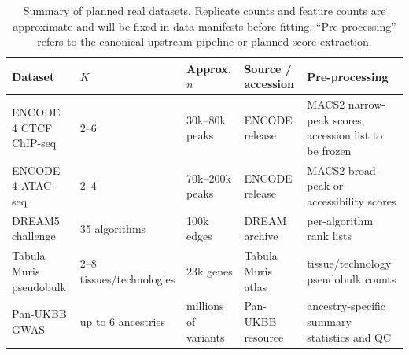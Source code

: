 \begin{table}[H]
\centering
{}
\caption{Summary of planned real datasets. Replicate counts and feature counts are approximate and will be fixed in data manifests before fitting. ``Pre-processing'' refers to the canonical upstream pipeline or planned score extraction.}
\label{tab:datasets}
\scriptsize
\setlength{\tabcolsep}{2pt}
\begin{tabularx}{\textwidth}{p{2.4cm}p{1.4cm}p{1.9cm}YY}
\toprule
Dataset & $K$ & Approx. $n$ & Source / accession & Pre-processing \\
\midrule
ENCODE 4 CTCF ChIP-seq & 2--6 & 30k--80k peaks & ENCODE release & MACS2 narrow-peak scores; accession list to be frozen \\
ENCODE 4 ATAC-seq & 2--4 & 70k--200k peaks & ENCODE release & MACS2 broad-peak or accessibility scores \\
DREAM5 challenge & 35 algorithms & 100k edges & DREAM archive & per-algorithm rank lists \\
Tabula Muris pseudobulk & 2--8 tissues/technologies & 23k genes & Tabula Muris atlas & tissue/technology pseudobulk counts \\
Pan-UKBB GWAS & up to 6 ancestries & millions of variants & Pan-UKBB resource & ancestry-specific summary statistics and QC \\
\bottomrule
\end{tabularx}
\end{table}
